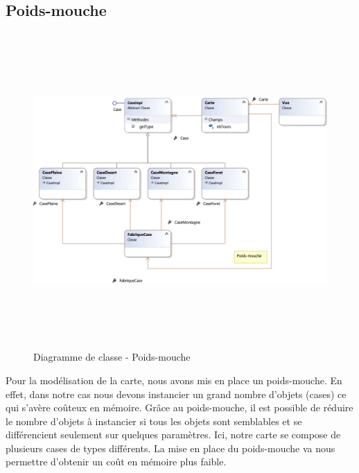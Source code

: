 \documentclass[a4paper,11pt]{article}
\begin{document}
	\subsection{Poids-mouche}
		\begin{figure}[ht!]
		\includegraphics[height=12cm,width=15cm]{Diagrammes/Classe/poidmouche.png}
		\caption{Diagramme de classe - Poids-mouche}
		\label{fig:poidmouche}
		\end{figure}
		\vspace*{1cm}
		Pour la modélisation de la carte, nous avons mis en place un poids-mouche. En effet, dans notre cas nous devons instancier un grand nombre d’objets (cases) ce qui s’avère coûteux en mémoire. Grâce au poids-mouche, il est possible de réduire le nombre d’objets à instancier si tous les objets sont semblables et se différencient seulement sur quelques paramètres. Ici, notre carte se compose de plusieurs cases de types différents. La mise en place du poids-mouche va nous permettre d’obtenir un coût en mémoire plus faible.
		\newpage
\end{document}
